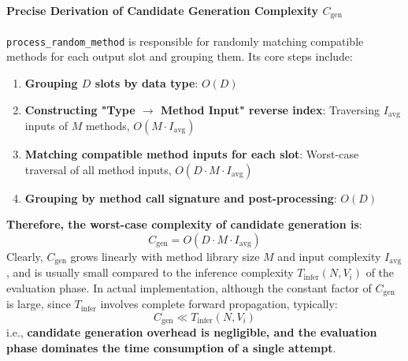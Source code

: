 \paragraph{Precise Derivation of Candidate Generation Complexity $C_{\mathrm{gen}}$}
\texttt{process\_random\_method} is responsible for randomly matching compatible methods for each output slot and grouping them. Its core steps include:
\begin{enumerate}
    \item \textbf{Grouping $D$ slots by data type}: $O(D)$
    \item \textbf{Constructing "Type $\to$ Method Input" reverse index}: Traversing $I_{\mathrm{avg}}$ inputs of $M$ methods, $O(M \cdot I_{\mathrm{avg}})$
    \item \textbf{Matching compatible method inputs for each slot}: Worst-case traversal of all method inputs, $O(D \cdot M \cdot I_{\mathrm{avg}})$
    \item \textbf{Grouping by method call signature and post-processing}: $O(D)$
\end{enumerate}

\textbf{Therefore, the worst-case complexity of candidate generation is}:
\begin{equation}
    C_{\mathrm{gen}} = O(D \cdot M \cdot I_{\mathrm{avg}})
\end{equation}
Clearly, $C_{\mathrm{gen}}$ grows linearly with method library size $M$ and input complexity $I_{\mathrm{avg}}$, and is usually small compared to the inference complexity $T_{\mathrm{infer}}(N, V_i)$ of the evaluation phase. In actual implementation, although the constant factor of $C_{\mathrm{gen}}$ is large, since $T_{\mathrm{infer}}$ involves complete forward propagation, typically:
\begin{equation}
    C_{\mathrm{gen}} \ll T_{\mathrm{infer}}(N, V_i)
\end{equation}
i.e., \textbf{candidate generation overhead is negligible, and the evaluation phase dominates the time consumption of a single attempt}.


